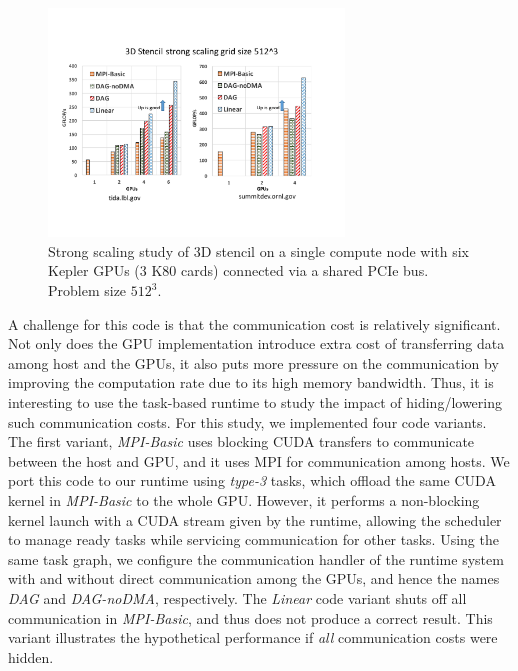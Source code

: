



\begin{figure}[htb]
\centering
\includegraphics[width=0.7\textwidth]{figures/stencil_single_node_tida.pdf}
\caption{Strong scaling study of 3D stencil on a single compute node with six Kepler GPUs (3 K80 cards) connected via a shared PCIe bus. Problem size $512^3$.}
\label{fig:stencil_single_nodes}
\end{figure}

A challenge for this code is that the communication cost is relatively significant.
Not only does the GPU implementation introduce extra cost of transferring data among host and the GPUs, it also puts more pressure on the communication by improving the computation rate due to its high memory bandwidth.
Thus, it is interesting to use the task-based runtime to study the impact of hiding/lowering such communication costs.
For this study, we implemented four code variants.
The first variant, {\em MPI-Basic} uses blocking CUDA transfers to communicate between the host and GPU, and it uses MPI for communication among hosts.
We port this code to our runtime using {\em type-3} tasks, which offload the same CUDA kernel in {\em MPI-Basic} to the whole GPU.
However, it performs a non-blocking kernel launch with a CUDA stream given by the runtime, allowing the scheduler to manage ready tasks while servicing communication for other tasks.
Using the same task graph, we configure the communication handler of the runtime system with and without direct communication among the GPUs, and hence the names {\em DAG} and {\em DAG-noDMA}, respectively.
The {\em Linear} code variant shuts off all communication in {\em MPI-Basic}, and thus does not produce a correct result.
This variant illustrates the hypothetical performance if {\em all} communication costs were hidden.

